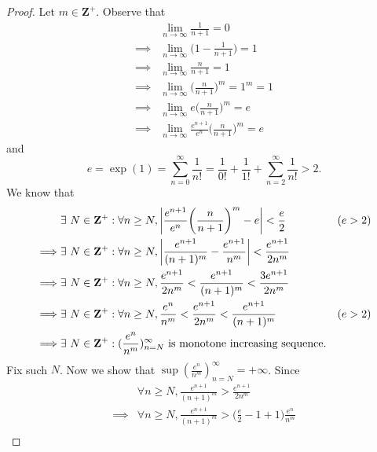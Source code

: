 \begin{proof}
    Let \(m \in \mathbf{Z}^+\).
    Observe that
    \begin{align*}
                 & \lim_{n \to \infty} \frac{1}{n + 1} = 0                                     \\
        \implies & \lim_{n \to \infty} \bigg(1 - \frac{1}{n + 1}\bigg) = 1                     \\
        \implies & \lim_{n \to \infty} \frac{n}{n + 1} = 1                                     \\
        \implies & \lim_{n \to \infty} \bigg(\frac{n}{n + 1}\bigg)^m = 1^m = 1                 \\
        \implies & \lim_{n \to \infty} e \bigg(\frac{n}{n + 1}\bigg)^m = e                     \\
        \implies & \lim_{n \to \infty} \frac{e^{n + 1}}{e^n} \bigg(\frac{n}{n + 1}\bigg)^m = e
    \end{align*}
    and
    \[
        e = \exp(1) = \sum_{n = 0}^\infty \frac{1}{n!} = \frac{1}{0!} + \frac{1}{1!} + \sum_{n = 2}^\infty \frac{1}{n!} > 2.
    \]
    We know that
    \begin{align*}
                 & \exists\ N \in \mathbf{Z}^+ : \forall n \geq N, \abs*{\frac{e^{n + 1}}{e^n} \bigg(\frac{n}{n + 1}\bigg)^m - e} < \frac{e}{2}         & (e > 2) \\
        \implies & \exists\ N \in \mathbf{Z}^+ : \forall n \geq N, \abs*{\frac{e^{n + 1}}{(n + 1)^m} - \frac{e^{n + 1}}{n^m}} < \frac{e^{n + 1}}{2 n^m}           \\
        \implies & \exists\ N \in \mathbf{Z}^+ : \forall n \geq N, \frac{e^{n + 1}}{2 n^m} < \frac{e^{n + 1}}{(n + 1)^m} < \frac{3 e^{n + 1}}{2 n^m}              \\
        \implies & \exists\ N \in \mathbf{Z}^+ : \forall n \geq N, \frac{e^n}{n^m} < \frac{e^{n + 1}}{2 n^m} < \frac{e^{n + 1}}{(n + 1)^m}              & (e > 2) \\
        \implies & \exists\ N \in \mathbf{Z}^+ : (\frac{e^n}{n^m})_{n = N}^\infty \text{ is monotone increasing sequence}.
    \end{align*}
    Fix such \(N\).
    Now we show that \(\sup(\frac{e^n}{n^m})_{n = N}^\infty = +\infty\).
    Since
    \begin{align*}
                 & \forall n \geq N, \frac{e^{n + 1}}{(n + 1)^m} > \frac{e^{n + 1}}{2 n^m}                                                                           \\
        \implies & \forall n \geq N, \frac{e^{n + 1}}{(n + 1)^m} > \bigg(\frac{e}{2} - 1 + 1\bigg) \frac{e^n}{n^m}                                                   \\

\end{align*}
\end{proof}
